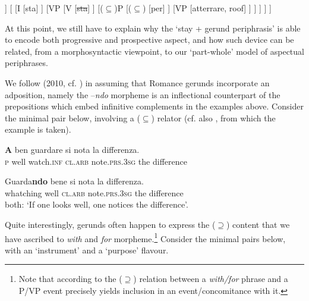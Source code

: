 \documentclass[output=paper,modfonts,nonflat,newtxmath,colorlinks,citecolor=brown]{langsci/langscibook}
\begin{document}
    

   
  \ea  \label{ex:franco:26}
    \begin{forest}
    [IP
    		[DP
    			[L'aereo]
    		]
    		[
    			[I
    				[sta]
    			]
    			[VP
    				[V
    					[\sout{sta}]
    				]	
    				[($\subseteq$)P
    					[($\subseteq$)
    						[per]
    					]
    					[VP
    						[atterrare, roof]
    					]
    				]
    			]
    		]
    	]
    	\end{forest}
    \z
                                                                          

At this point, we still have to explain why the ‘stay + gerund periphrasis’ is able to encode both progressive and prospective aspect, and how such device can be related, from a morphosyntactic viewpoint, to our ‘part-whole’ model of aspectual periphrases.

We follow \citeauthor{Gallego2010} (2010, cf. \citealt{Mateu2002, Franco2015}) in assuming that Romance gerunds incorporate an adposition, namely the –\textit{ndo} morpheme is an inflectional counterpart of the prepositions which embed infinitive complements in the examples above. Consider the minimal pair below, involving a (${\subseteq}$) relator (cf. also \citealt{Casalicchio2013}, from which the example  is taken). %

\ea%
    \label{ex:franco:27}
    \ea \label{ex:franco:27a}
    \gll \textbf{A} ben guardare si nota la differenza.\\
        \textsc{p} well watch.\textsc{inf} \textsc{cl.arb} note.\textsc{prs.3sg} the difference\\
    \glt
    
     \ex \label{ex:franco:27b}
    \gll  Guarda\textbf{ndo} bene si nota la differenza.\\
       whatching well \textsc{cl.arb} note.\textsc{prs.3sg} the difference\\
    \glt both: `If one looks well, one notices the difference’.
    \z
    \z

 

Quite interestingly, gerunds often happen to express the (${\supseteq}$) content that we have ascribed to \textit{with} and \textit{for} morpheme.\footnote{Note that according to \citealt{FrancoManzini2017Ins} the (\textrm{${\supseteq}$}) relation between a \textit{with/for} phrase and a \liv P/VP event precisely yields inclusion in an event/concomitance with it.} Consider the minimal pairs below, with an ‘instrument’  and a ‘purpose’  flavour.
\end{document}
